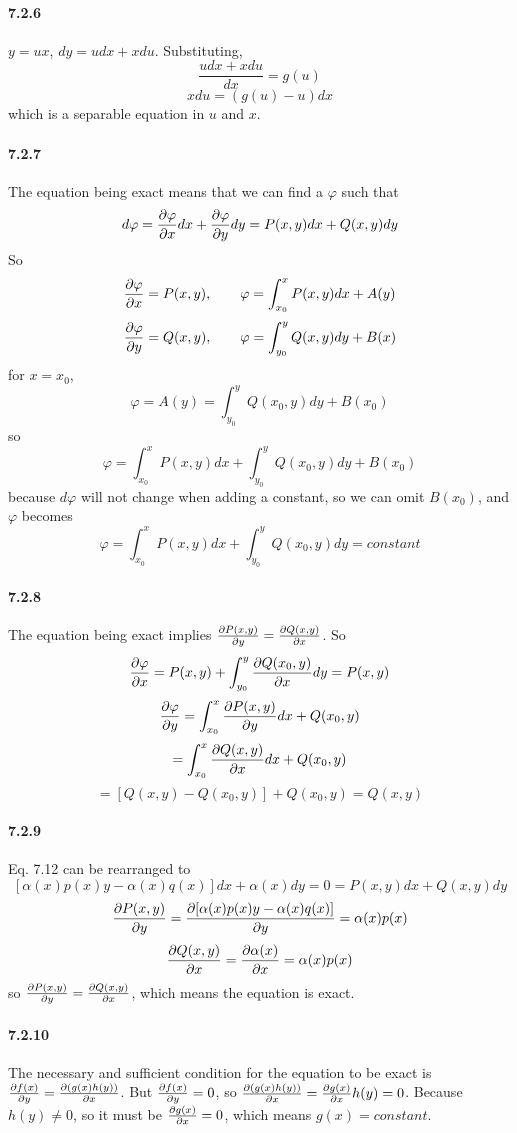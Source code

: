 \documentclass[a4paper]{article}
\begin{document}
\paragraph{7.2.6}
$y=ux$, $dy=udx+xdu$. Substituting, 
\[
\frac{udx+xdu}{dx}=g(u)
\]
\[
xdu=(g(u)-u)dx
\]
which is a separable equation in $u$ and $x$.

\paragraph{7.2.7}
The equation being exact means that we can find a $\varphi$ such that
\[
d\varphi=\frac{\partial\varphi}{\partial x}dx+\frac{\partial\varphi}{\partial y}dy=P(x,y)dx+Q(x,y)dy
\]
So
\[
\frac{\partial\varphi}{\partial x}=P(x,y),\qquad \varphi=\int_{x_0}^xP(x,y)dx+A(y)
\]
\[
\frac{\partial\varphi}{\partial y}=Q(x,y),\qquad \varphi=\int_{y_0}^yQ(x,y)dy+B(x)
\]
for $x=x_0$,
\[
\varphi=A(y)=\int_{y_0}^yQ(x_0,y)dy+B(x_0)
\]
so
\[
\varphi=\int_{x_0}^xP(x,y)dx+\int_{y_0}^yQ(x_0,y)dy+B(x_0)
\]
because $d\varphi$ will not change when adding a constant, so we can omit $B(x_0)$, and $\varphi$ becomes
\[
\varphi=\int_{x_0}^xP(x,y)dx+\int_{y_0}^yQ(x_0,y)dy=constant
\]

\paragraph{7.2.8}
The equation being exact implies $\frac{\partial P(x,y)}{\partial y}=\frac{\partial Q(x,y)}{\partial x}$. So
\[
\frac{\partial\varphi}{\partial x}=P(x,y)+\int_{y_0}^y\frac{\partial Q(x_0,y)}{\partial x}dy=P(x,y)
\]
\[
\frac{\partial\varphi}{\partial y}=\int_{x_0}^x\frac{\partial P(x,y)}{\partial y}dx+Q(x_0,y)
\]
\[
=\int_{x_0}^x\frac{\partial Q(x,y)}{\partial x}dx+Q(x_0,y)
\]
\[
=[Q(x,y)-Q(x_0,y)]+Q(x_0,y)=Q(x,y)
\]

\paragraph{7.2.9}
Eq. 7.12 can be rearranged to 
\[
[\alpha(x)p(x)y-\alpha(x)q(x)]dx+\alpha(x)dy=0=P(x,y)dx+Q(x,y)dy
\]
\[
\frac{\partial P(x,y)}{\partial y}=\frac{\partial[\alpha(x)p(x)y-\alpha(x)q(x)]}{\partial y}=\alpha(x)p(x)
\]
\[
\frac{\partial Q(x,y)}{\partial x}=\frac{\partial\alpha(x)}{\partial x}=\alpha(x)p(x)
\]
so $\frac{\partial P(x,y)}{\partial y}=\frac{\partial Q(x,y)}{\partial x}$, which means the equation is exact.

\paragraph{7.2.10}
The necessary and
sufficient condition for the equation to be exact is $\frac{\partial f(x)}{\partial y}=\frac{\partial(g(x)h(y))}{\partial x}$. But $\frac{\partial f(x)}{\partial y}=0$, so $\frac{\partial(g(x)h(y))}{\partial x}=\frac{\partial g(x)}{\partial x}h(y)=0$. Because $h(y)\neq0$, so it must be $\frac{\partial g(x)}{\partial x}=0$, which means $g(x)=constant$.
\end{document}
